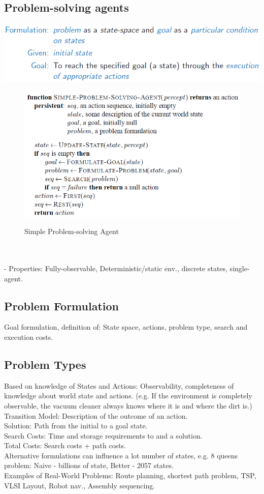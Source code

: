 \documentclass{article}
\begin{document}
\subsection{Problem-solving agents}
\includegraphics[scale=0.6]{8.png}\\
\begin{figure}
\includegraphics[scale=0.6]{9.png}\\
\caption{Simple Problem-solving Agent}
\end{figure}\\\\
- Properties: Fully-observable, Deterministic/static env., discrete states, single-agent.\\

\subsection{Problem Formulation}
Goal formulation, definition of: State space, actions, problem type, search and execution costs.\\
\subsection{Problem Types}
Based on knowledge of States and Actions: Observability, completeness of knowledge about world state and actions. (e.g. If the environment is completely observable, the vacuum cleaner always knows where it is and where the dirt is.)\\
Transition Model: Description of the outcome of an action.\\
Solution: Path from the initial to a goal state.\\
Search Costs: Time and storage requirements to and a solution.\\
Total Costs: Search costs + path costs.\\
Alternative formulations can influence a lot number of states, e.g. 8 queens problem: Naive - billions of state, Better - 2057 states.\\
Examples of Real-World Problems: Route planning, shortest path problem, TSP, VLSI Layout, Robot nav., Assembly sequencing.\\
\end{document}

